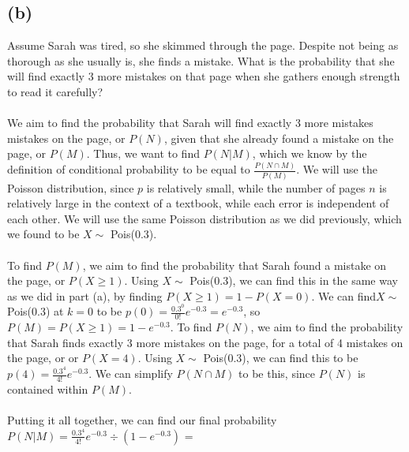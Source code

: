 \documentclass{article}
\begin{document}
{\subsection*{(b)}
Assume Sarah was tired, so she skimmed through the page. Despite not being as thorough as she usually is, she finds a mistake. What is the probability that she will find exactly 3 more mistakes on that page when she gathers enough strength to read it carefully? \\ \\
We aim to find the probability that Sarah will find exactly 3 more mistakes mistakes on the page, or $P(N)$, given that she already found a mistake on the page, or $P(M)$. Thus, we want to find $P(N | M)$, which we know by the definition of conditional probability to be equal to $\frac{P(N \cap M)}{P(M)}$. We will use the Poisson distribution, since $p$ is relatively small, while the number of pages $n$ is relatively large in the context of a textbook, while each error is independent of each other. We will use the same Poisson distribution as we did previously, which we found to be $X \sim $ Pois(0.3). \\ \\ 
To find $P(M)$, we aim to find the probability that Sarah found a mistake on the page, or $P(X \geq 1)$. Using $X \sim $ Pois(0.3), we can find this in the same way as we did in part (a), by finding $P(X \geq 1) = 1 - P(X = 0)$. We can find$X \sim $ Pois(0.3) at $k = 0$ to be $p(0) = \frac{0.3^0}{0!}e^{-0.3} = e^{-0.3}$, so $P(M) = P(X \geq 1) = 1 - e^{-0.3}$.
To find $P(N)$, we aim to find the probability that Sarah finds exactly 3 more mistakes on the page, for a total of 4 mistakes on the page, or or $P(X = 4)$. Using $X \sim $ Pois(0.3), we can find this to be $p(4) = \frac{0.3^4}{4!}e^{-0.3}$. We can simplify $P(N \cap M)$ to be this, since $P(N)$ is contained within $P(M)$. \\ \\ 
Putting it all together, we can find our final probability $P(N | M) = \frac{0.3^4}{4!}e^{-0.3} \div (1 - e^{-0.3})$ = 

}
\end{document}
